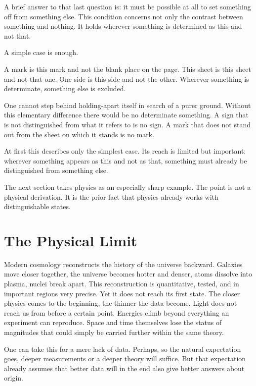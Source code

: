\documentclass[11pt,a4paper]{book}
\begin{document}
A brief answer to that last question is: it must be possible at all to set
something off from something else. This condition concerns not only the
contrast between something and nothing. It holds wherever something is
determined as this and not that.

A simple case is enough.

A mark is this mark and not the blank place on the page. This sheet is this
sheet and not that one. One side is this side and not the other. Wherever
something is determinate, something else is excluded.

One cannot step behind holding-apart itself in search of a purer ground.
Without this elementary difference there would be no determinate something.
A sign that is not distinguished from what it refers to is no sign. A mark
that does not stand out from the sheet on which it stands is no mark.

At first this describes only the simplest case. Its reach is limited but
important: wherever something appears as this and not as that, something
must already be distinguished from something else.

The next section takes physics as an especially sharp example. The point is
not a physical derivation. It is the prior fact that physics already works
with distinguishable states.

\section{The Physical Limit}
\label{ch:edge}

Modern cosmology reconstructs the history of the universe backward.
Galaxies move closer together, the universe becomes hotter and denser,
atoms dissolve into plasma, nuclei break apart. This reconstruction is
quantitative, tested, and in important regions very precise. Yet it does
not reach its first state. The closer physics comes to the beginning, the
thinner the data become. Light does not reach us from before a certain
point. Energies climb beyond everything an experiment can reproduce. Space
and time themselves lose the status of magnitudes that could simply be
carried further within the same theory.

One can take this for a mere lack of data. Perhaps, so the natural
expectation goes, deeper measurements or a deeper theory will suffice. But
that expectation already assumes that better data will in the end also give
better answers about origin.
\end{document}
